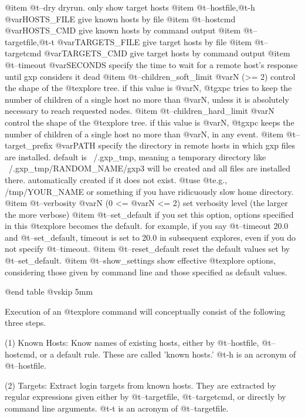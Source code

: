 @item   @t{--dry}
    dryrun. only show target hosts
@item   @t{--hostfile},@t{-h} @var{HOSTS_FILE}
    give known hosts by file
@item   @t{--hostcmd} @var{HOSTS_CMD}
    give known hosts by command output
@item   @t{--targetfile},@t{-t} @var{TARGETS_FILE}
    give target hosts by file
@item   @t{--targetcmd} @var{TARGETS_CMD}
    give target hosts by command output
@item   @t{--timeout} @var{SECONDS}
    specify the time to wait for a remote host's response
    until gxp considers it dead
@item   @t{--children_soft_limit} @var{N} (>= 2)
    control the shape of the @t{explore} tree. if this value is @var{N}, @t{gxpc}
    tries to keep the number of children of a single host no more than @var{N},
    unless it is absolutely necessary to reach requested nodes.
@item   @t{--children_hard_limit} @var{N}
    control the shape of the @t{explore} tree. if this value is @var{N}, @t{gxpc}
    keeps the number of children of a single host no more than @var{N}, in any event.
@item   @t{--target_prefix} @var{PATH}
    specify the directory in remote hosts in which gxp files are installed.
    default is ~/.gxp_tmp, meaning a temporary directory like
    ~/.gxp_tmp/RANDOM_NAME/gxp3 will be created and all files are installed
    there. automatically created if it does not exist. @t{use} @t{e}.g., /tmp/YOUR_NAME
    or something if you have ridicuously slow home directory.
@item   @t{--verbosity} @var{N} (0 <= @var{N} <= 2)
    set verbosity level (the larger the more verbose)
@item   @t{--set_default}
    if you set this option, options specified in this @t{explore} becomes the default.
    for example, if you say @t{--timeout} 20.0 and @t{--set_default}, timeout is set to
    20.0 in subsequent explores, even if you do not specify @t{--timeout}.
@item   @t{--reset_default}
    reset the default values set by @t{--set_default}.
@item   @t{--show_settings}
    show effective @t{explore} options, considering those given by command line and
    those specified as default values.

@end table
@vskip 5mm

Execution of an @t{explore} command will conceptually consist of the
following three steps.

(1) Known Hosts: Know names of existing hosts, either by
@t{--hostfile}, @t{--hostcmd}, or a default rule. These are called
'known hosts.' @t{-h} is an acronym of @t{--hostfile}.

(2) Targets: Extract login targets from known hosts. They are
extracted by regular expressions given either by @t{--targetfile},
@t{--targetcmd}, or directly by command line arguments. @t{-t} is
an acronym of @t{--targetfile}.


